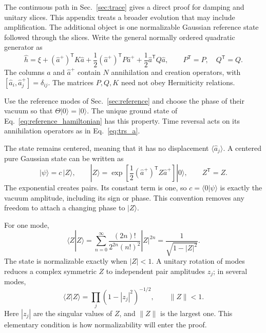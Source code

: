 \documentclass[11pt,a4paper]{article}
\newcommand{\trans}{\mathsf T}
\numberwithin{equation}{section}
\begin{document}
The continuous path in Sec.~\ref{sec:trace} gives a direct proof
for damping and unitary slices. This appendix treats a broader evolution
that may include amplification. The additional object is one normalizable
Gaussian reference state followed through the slices. Write the general
normally ordered quadratic generator as
\begin{equation}
 \hat h=\xi+(\hat a^+)^\trans K\hat a
 +\frac12(\hat a^+)^\trans P\hat a^+
 +\frac12\hat a^\trans Q\hat a,
 \qquad P^\trans=P,\quad Q^\trans=Q.
 \label{eq:normal_generator}
\end{equation}
The columns $\hat a$ and $\hat a^+$ contain $N$ annihilation and creation
operators, with $[\hat a_i,\hat a_j^+]=\delta_{ij}$. The matrices $P,Q,K$ need
not obey Hermiticity relations.

Use the reference modes of Sec.~\ref{sec:reference} and choose the phase
of their vacuum so that $\Theta|0\rangle=|0\rangle$.
The unique ground state of Eq.~\eqref{eq:reference_hamiltonian} has
this property. Time reversal acts on its annihilation operators as
in Eq.~\eqref{eq:trs_a}.

The state remains centered, meaning that it has no displacement
$\langle\hat a_j\rangle$. A centered pure Gaussian state can be written as
\begin{equation}
 |\psi\rangle=c\,|Z\rangle,
 \qquad
 |Z\rangle=\exp\!\left[\frac12(\hat a^+)^\trans Z\hat a^+\right]|0\rangle,
 \qquad Z^\trans=Z.
 \label{eq:squeezed_state}
\end{equation}
The exponential creates pairs. Its constant term is one, so
$c=\langle0|\psi\rangle$ is exactly the vacuum amplitude, including its
sign or phase. This convention removes any freedom to attach a changing
phase to $|Z\rangle$.

For one mode,
\begin{equation}
 \langle Z|Z\rangle
 =\sum_{n=0}^{\infty}\frac{(2n)!}{2^{2n}(n!)^2}|Z|^{2n}
 =\frac{1}{\sqrt{1-|Z|^2}}.
 \label{eq:squeezed_norm_one}
\end{equation}
The state is normalizable exactly when $|Z|<1$. A unitary rotation of modes
reduces a complex symmetric $Z$ to independent pair amplitudes $z_j$; in
several modes,
\begin{equation}
 \langle Z|Z\rangle=\prod_j(1-|z_j|^2)^{-1/2},
 \qquad \|Z\|<1.
 \label{eq:squeezed_norm}
\end{equation}
Here $|z_j|$ are the singular values of $Z$, and $\|Z\|$ is the largest
one. This elementary condition is how normalizability will enter the proof.
\end{document}

